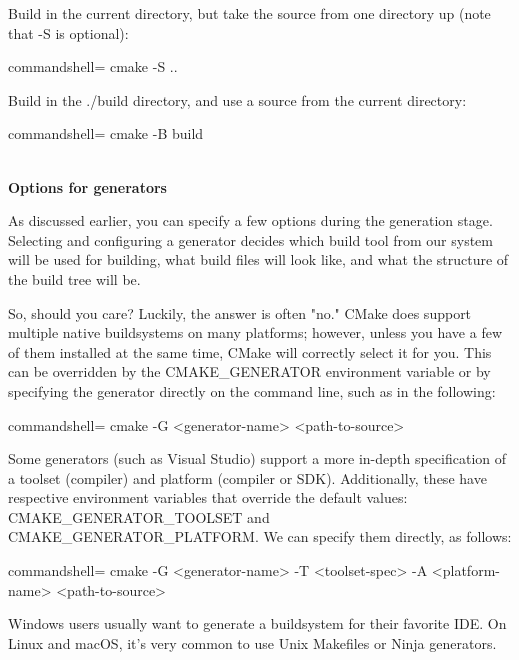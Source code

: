 Build in the current directory, but take the source from one directory up (note that -S is optional):

\begin{tcblisting}{commandshell={}}
cmake -S ..
\end{tcblisting}

Build in the ./build directory, and use a source from the current directory:

\begin{tcblisting}{commandshell={}}
cmake -B build
\end{tcblisting}

\hspace*{\fill} \\ %
\noindent
\textbf{Options for generators}

As discussed earlier, you can specify a few options during the generation stage. Selecting and configuring a generator decides which build tool from our system will be used for building, what build files will look like, and what the structure of the build tree will be.
 
So, should you care? Luckily, the answer is often "no." CMake does support multiple native buildsystems on many platforms; however, unless you have a few of them installed at the same time, CMake will correctly select it for you. This can be overridden by the CMAKE\_GENERATOR environment variable or by specifying the generator directly on the command line, such as in the following:

\begin{tcblisting}{commandshell={}}
cmake -G <generator-name> <path-to-source>
\end{tcblisting}

Some generators (such as Visual Studio) support a more in-depth specification of a toolset (compiler) and platform (compiler or SDK). Additionally, these have respective environment variables that override the default values: CMAKE\_GENERATOR\_TOOLSET and CMAKE\_GENERATOR\_PLATFORM. We can specify them directly, as follows:

\begin{tcblisting}{commandshell={}}
cmake -G <generator-name>
      -T <toolset-spec> -A <platform-name>
      <path-to-source>
\end{tcblisting}

Windows users usually want to generate a buildsystem for their favorite IDE. On Linux and macOS, it's very common to use Unix Makefiles or Ninja generators.

